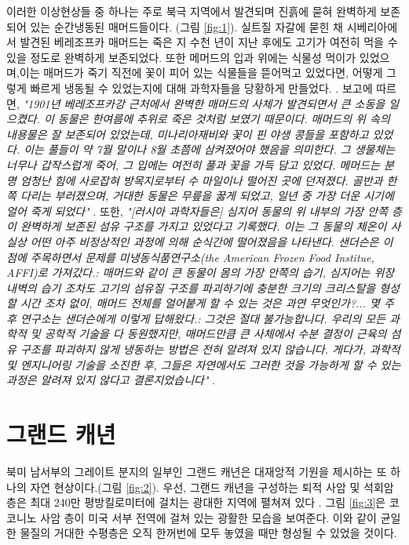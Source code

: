 \documentclass[10pt,twocolumn,letterpaper]{article}
\begin{document}
이러한 이상현상들 중 하나는 주로 북극 지역에서 발견되며 진흙에 묻혀 완벽하게 보존되어 있는 순간냉동된 매머드들이다. (그림 \ref{fig:1}). 실트질 자갈에 묻힌 채 시베리아에서 발견된 베레조프카 매머드는 죽은 지 수천 년이 지난 후에도 고기가 여전히 먹을 수 있을 정도로 완벽하게 보존되었다. 또한   메머드의 입과 위에는 식물성 먹이가 있었으며,이는 매머드가 죽기 직전에 꽃이 피어 있는 식물들을 뜯어먹고 있었다면, 어떻게 그렇게 빠르게 냉동될 수 있었는지에 대해 과학자들을 당황하게 만들었다. \cite{17}. 보고에 따르면, \textit{"1901년 베레조프카강 근처에서 완벽한 매머드의 사체가 발견되면서 큰 소동을 일으켰다. 이 동물은 한여름에 추위로  죽은 것처럼 보였기 때문이다. 매머드의 위 속의 내용물은 잘 보존되어 있었는데, 미나리아재비와 꽃이 핀 야생 콩들을 포함하고 있었다. 이는 풀들이 약 7월 말이나 8월 초쯤에 삼켜졌어야 했음을 의미한다. 그 생물체는 너무나 갑작스럽게 죽어, 그 입에는 여전히 풀과 꽃을 가득 담고 있었다. 메머드는 분명 엄청난 힘에 사로잡혀 방목지로부터 수 마일이나 떨어진 곳에 던져졌다. 골반과 한쪽 다리는 부러졌으며, 거대한 동물은 무릎을 꿇게 되었고, 일년 중 가장 더운 시기에 얼어 죽게 되었다"} \cite{18}. 또한, \textit{"[러시아 과학자들은] 심지어 동물의 위 내부의 가장 안쪽 층이 완벽하게 보존된 섬유 구조를 가지고 있었다고 기록했다. 이는 그 동물의 체온이 사실상 어떤 아주 비정상적인 과정에 의해 순식간에 떨어졌음을 나타낸다. 샌더슨은 이 점에 주목하면서 문제를 미냉동식품연구소(the American Frozen Food Institue, AFFI)로 가져갔다.: 매머드와 같이 큰 동물이 몸의 가장 안쪽의 습기, 심지어는 위장 내벽의 습기 조차도  고기의 섬유질 구조를 파괴하기에 충분한 크기의 크리스탈을 형성할 시간 조차 없이, 매머드 전체를 얼어붙게 할 수 있는 것은 과연 무엇인가?... 몇 주 후 연구소는 샌더슨에게 이렇게 답해왔다.: 그것은 절대 불가능합니다. 우리의 모든 과학적 및 공학적 기술을 다 동원했지만, 매머드만큼 큰 사체에서 수분 결정이 근육의 섬유 구조를 파괴하지 않게 냉동하는 방법은 전혀 알려져 있지 않습니다. 게다가, 과학적 및 엔지니어링 기술을 소진한 후, 그들은 자연에서도 그러한 것을 가능하게 할 수 있는 과정은 알려져 있지 않다고 결론지었습니다"} \cite{19}.

\section{그랜드 캐년}

북미 남서부의 그레이트 분지의 일부인 그랜드 캐년은 대재앙적 기원을 제시하는 또 하나의 자연 현상이다.(그림 \ref{fig:2}). 우선, 그랜드 캐년을 구성하는 퇴적 사암 및 석회암 층은 최대 240만 평방킬로미터에 걸치는 광대한 지역에 펼쳐져 있다 \cite{21}. 그림 \ref{fig:3}은 코코니노 사암 층이 미국 서부 전역에 걸쳐 있는 광활한 모습을 보여준다. 이와 같이 균일한 물질의 거대한 수평층은 오직 한꺼번에  모두 놓였을 때만 형성될 수 있었을 것이다.
\end{document}
